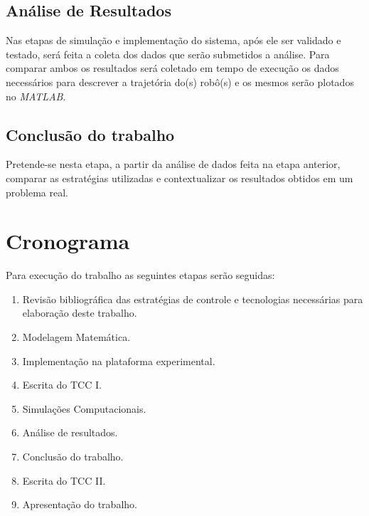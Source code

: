 \section{Análise de Resultados}

Nas etapas de simulação e implementação do sistema, após ele ser validado e testado, será feita a coleta dos dados que serão submetidos a análise. Para comparar ambos os resultados será coletado em tempo de execução os dados necessários para descrever a trajetória do(s) robô(s) e os mesmos serão plotados no \emph{MATLAB}.

\section{Conclusão do trabalho}

Pretende-se nesta etapa, a partir da análise de dados feita na etapa anterior, comparar as estratégias utilizadas e contextualizar os resultados obtidos em um problema real.

\chapter{Cronograma}

Para execução do trabalho as seguintes etapas serão seguidas:

\begin{enumerate}
	\item Revisão bibliográfica das estratégias de controle e tecnologias 
	necessárias para elaboração deste trabalho.
	\item Modelagem Matemática.
	\item Implementação na plataforma experimental.
	\item Escrita do TCC I.
	\item Simulações Computacionais.
	\item Análise de resultados.
	\item Conclusão do trabalho.
	\item Escrita do TCC II.
	\item Apresentação do trabalho.
\end{enumerate}


